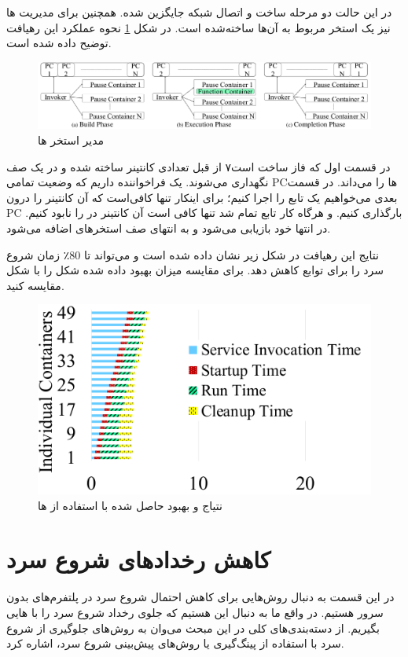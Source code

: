 در این حالت دو مرحله ساخت و اتصال شبکه جایگزین شده. همچنین برای مدیریت  ها نیز یک استخر مربوط به آن‌ها ساخته‌شده است. در شکل \ref{fig:Pause-Container-Pool-Manager} نحوه عملکرد این رهیافت توضیح داده شده است.

\begin{figure}
	\centering
	\includegraphics[width=\linewidth]{figs/Pause-Container-Pool-Manager}
	\caption {مدیر استخر ها}
	\label{fig:Pause-Container-Pool-Manager}
\end{figure}
 
در قسمت اول که فاز ساخت است۷ از قبل تعدادی کانتینر ساخته شده و در یک صف نگهداری می‌شوند. یک فراخواننده داریم که وضعیت تمامی PCها را می‌داند. در قسمت بعدی می‌خواهیم یک تابع را اجرا کنیم؛ برای اینکار تنها کافی‌است که آن کانتینر را درون PC بارگذاری کنیم. و هرگاه کار تابع تمام شد تنها کافی است آن کانتینر در  را نابود کنیم. در انتها خود  بازیابی می‌شود و به انتهای صف استخرهای  اضافه می‌شود. 

نتایج این رهیافت در شکل زیر نشان داده شده است و می‌تواند تا 80٪ زمان شروع سرد را برای توابع کاهش دهد. برای مقایسه میزان بهبود داده شده شکل را با شکل مقایسه کنید.


\begin{figure}
	\centering
	\includegraphics[width=\linewidth]{figs/Pause-Containers-Results}
	\caption {نتیاج و بهبود حاصل شده با استفاده از ها}
	\label{fig:Pause-Containers-Results}
\end{figure}


\section{کاهش رخداد‌های شروع سرد}

در این قسمت به دنبال روش‌هایی برای کاهش احتمال شروع سرد در پلتفرم‌های بدون سرور هستیم. در واقع ما به دنبال این هستیم که جلوی رخداد شروع سرد را با هایی بگیریم. از دسته‌بندی‌های کلی در این مبحث می‌وان به روش‌های جلوگیری از شروع سرد با استفاده از پینگ‌گیری یا روش‌های پیش‌بینی شروع سرد، اشاره کرد. 